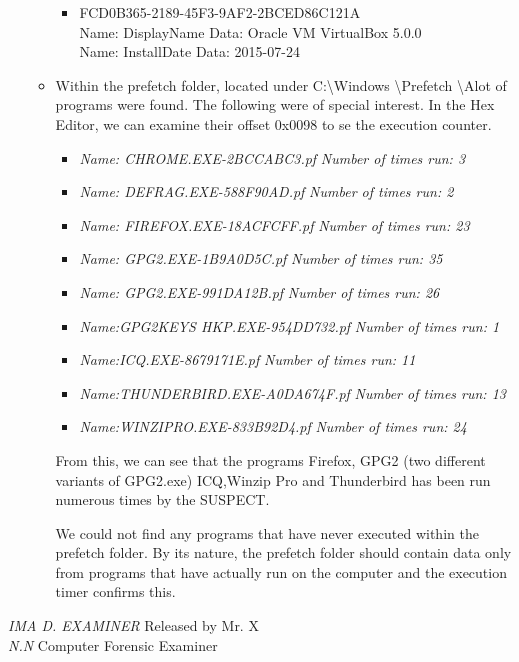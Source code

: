 \begin{enumerate}
\begin{itemize}
\begin{itemize}
		\item \textbraceleft FCD0B365-2189-45F3-9AF2-2BCED86C121A \textbraceright \\
		Name: DisplayName Data: Oracle VM VirtualBox 5.0.0 \\
		Name: InstallDate Data: 2015-07-24 \\
		
		
	\end{itemize}
	
	\item Within the prefetch folder, located under C:\textbackslash Windows \textbackslash Prefetch \textbackslash Alot of programs were found. The following were of special interest. In the Hex Editor, we can examine their offset 0x0098 to se the execution counter.
	
		\begin{itemize}
			\item \textit{Name: CHROME.EXE-2BCCABC3.pf}   \textit{Number of times run: 3}		
			\item \textit{Name: DEFRAG.EXE-588F90AD.pf}   \textit{Number of times run: 2}
			\item \textit{Name: FIREFOX.EXE-18ACFCFF.pf}   \textit{Number of times run: 23}
			\item \textit{Name: GPG2.EXE-1B9A0D5C.pf}   \textit{Number of times run: 35}
			\item \textit{Name: GPG2.EXE-991DA12B.pf}  	\textit{Number of times run: 26}
			\item \textit{Name:GPG2KEYS \textunderscore HKP.EXE-954DD732.pf}   \textit{Number of times run: 1}
			\item \textit{Name:ICQ.EXE-8679171E.pf}   	\textit{Number of times run: 11}
			\item \textit{Name:THUNDERBIRD.EXE-A0DA674F.pf}   \textit{Number of times run: 13}
			\item \textit{Name:WINZIPRO.EXE-833B92D4.pf}  	\textit{Number of times run: 24}
			
		\end{itemize}
	
	From this, we can see that the programs Firefox, GPG2 (two different variants of GPG2.exe) ICQ,Winzip Pro and Thunderbird has been run numerous times by the SUSPECT.
	
	We could not find any programs that have never executed within the prefetch folder. By its nature, the prefetch folder should contain data only from programs that have actually run on the computer and the execution timer confirms this.
	
\end{itemize}

\end{enumerate}

\noindent \textit{IMA D. EXAMINER}	\hfill Released by {\wesa Mr. X}\\
\textit{N.N} Computer Forensic Examiner
\clearpage
